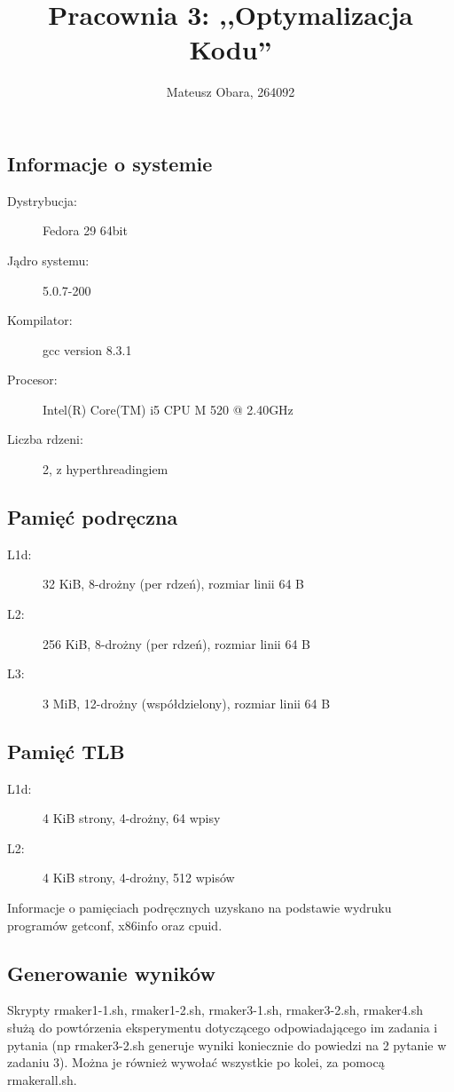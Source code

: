 \documentclass[a4paper,12pt]{mwart} %
\title{Pracownia 3: ,,Optymalizacja Kodu''}
\author{Mateusz Obara, 264092}
\begin{document}
\maketitle
\thispagestyle{empty}

\subsection*{Informacje o systemie}

\begin{description}
	\item[Dystrybucja:] Fedora 29 64bit
	\item[Jądro systemu:] 5.0.7-200
	\item[Kompilator:] gcc version 8.3.1
	\item[Procesor:] Intel(R) Core(TM) i5 CPU       M 520  @ 2.40GHz
	\item[Liczba rdzeni:] 2, z hyperthreadingiem
\end{description}

\subsection*{Pamięć podręczna}

\begin{description}
	\item[L1d:] 32 KiB, 8-drożny (per rdzeń), rozmiar linii 64 B
	\item[L2:]  256 KiB, 8-drożny (per rdzeń), rozmiar linii 64 B
	\item[L3:] 3 MiB, 12-drożny (współdzielony), rozmiar linii 64 B
\end{description}

\subsection*{Pamięć TLB}

\begin{description}
	\item[L1d:] 4 KiB strony, 4-drożny, 64 wpisy
	\item[L2:] 4 KiB strony, 4-drożny, 512 wpisów
\end{description}

Informacje o pamięciach podręcznych uzyskano na podstawie wydruku programów getconf, x86info oraz cpuid.
\subsection*{Generowanie wyników}
Skrypty rmaker1-1.sh, rmaker1-2.sh, rmaker3-1.sh, rmaker3-2.sh, rmaker4.sh służą do powtórzenia eksperymentu dotyczącego odpowiadającego im zadania i pytania (np rmaker3-2.sh generuje wyniki koniecznie do powiedzi na 2 pytanie w zadaniu 3). Można je również wywołać wszystkie po kolei, za pomocą rmakerall.sh.
\end{document}
